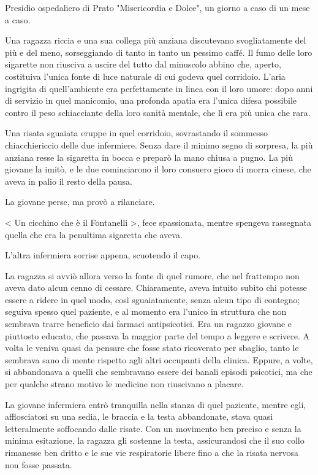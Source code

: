 Presidio ospedaliero di Prato "Misericordia e Dolce", un giorno a caso di un mese a caso.

Una ragazza riccia e una sua collega più anziana discutevano svogliatamente del più e del meno, sorseggiando di tanto in tanto un pessimo caffé. Il fumo delle loro sigarette non riusciva a uscire del tutto dal minuscolo abbino che, aperto, costituiva l'unica fonte di luce naturale di cui godeva quel corridoio. L'aria ingrigita di quell'ambiente era perfettamente in linea con il loro umore: dopo anni di servizio in quel manicomio, una profonda apatia era l'unica difesa possibile contro il peso schiacciante della loro sanità mentale, che lì era più unica che rara.

Una risata sguaiata eruppe in quel corridoio, sovrastando il sommesso chiacchiericcio delle due infermiere. Senza dare il minimo segno di sorpresa, la più anziana resse la sigaretta in bocca e preparò la mano chiusa a pugno. La più giovane la imitò, e le due cominciarono il loro consuero gioco di morra cinese, che aveva in palio il resto della pausa.

La giovane perse, ma provò a rilanciare.

< Un cicchino che è il Fontanelli >, fece spassionata, mentre spengeva rassegnata quella che era la penultima sigaretta che aveva.

L'altra infermiera sorrise appena, scuotendo il capo.

La ragazza si avviò allora verso la fonte di quel rumore, che nel frattempo non aveva dato alcun cenno di cessare. Chiaramente, aveva intuito subito chi potesse essere a ridere in quel modo, così sguaiatamente, senza alcun tipo di contegno; seguiva spesso quel paziente, e al momento era l'unico in struttura che non sembrava trarre beneficio dai farmaci antipsicotici. Era un ragazzo giovane e piuttosto educato, che passava la maggior parte del tempo a leggere e scrivere. A volta le veniva quasi da pensare che fosse stato ricoverato per sbaglio, tanto le sembrava sano di mente rispetto agli altri occupanti della clinica. Eppure, a volte, si abbandonava a quelli che sembravano essere dei banali episodi psicotici, ma che per qualche strano motivo le medicine non riuscivano a placare.

La giovane infermiera entrò tranquilla nella stanza di quel paziente, mentre egli, afflosciatosi su una sedia, le braccia e la testa abbandonate, stava quasi letteralmente soffocando dalle risate. Con un movimento ben preciso e senza la minima esitazione, la ragazza gli sostenne la testa, assicurandosi che il suo collo rimanesse ben dritto e le sue vie respiratorie libere fino a che la risata nervosa non fosse passata.

